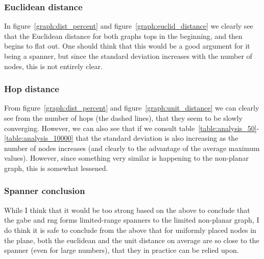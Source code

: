\subsubsection{Euclidean distance}

In figure~\ref{graph:dist_percent} and figure~\ref{graph:euclid_distance} we clearly see that the Euclidean distance for both graphs tops in the beginning, and then begins to flat out. One should think that this would be a good argument for it being a spanner, but since the standard deviation increases with the number of nodes, this is not entirely clear.

\subsubsection{Hop distance}


From figure~\ref{graph:dist_percent} and figure~\ref{graph:unit_distance} we can clearly see from the number of hops (the dashed lines), that they seem to be slowly converging. However, we can also see that if we consult table~\ref{table:analysis_50}-\ref{table:analysis_10000} that the standard deviation is also increasing as the number of nodes increases (and clearly to the advantage of the average maximum values). However, since something very similar is happening to the non-planar graph, this is somewhat lessened.

\subsubsection{Spanner conclusion}

While I think that it would be too strong based on the above to conclude that the \ac{gabe} and \ac{rng} forms limited-range spanners to the limited non-planar graph, I do think it is safe to conclude from the above that for uniformly placed nodes in the plane, both the euclidean and the unit distance on average are so close to the spanner (even for large numbers), that they in practice can be relied upon.

\subsection{}
